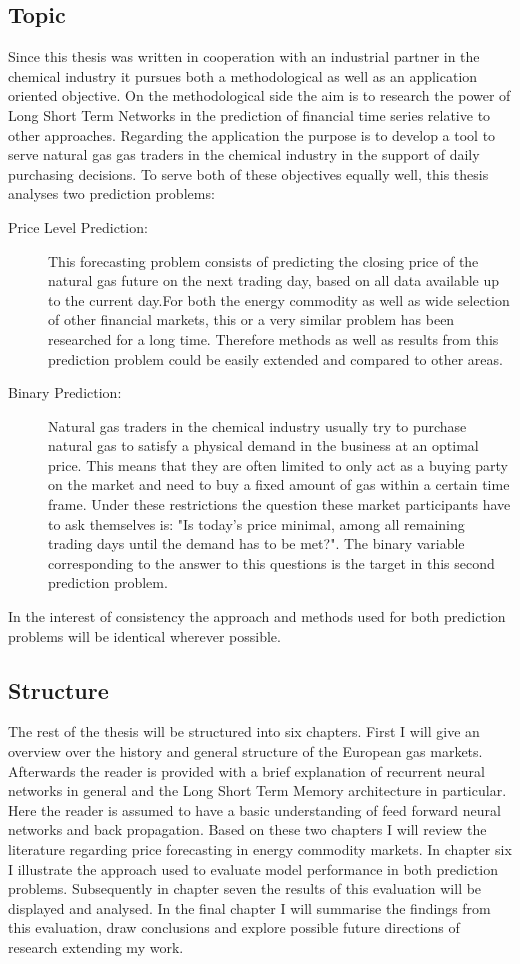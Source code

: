 \subsection{Topic}
Since this thesis was written in cooperation with an industrial partner in the chemical industry it pursues both a methodological as well as an application oriented objective. On the methodological side the aim is to research the power of Long Short Term Networks in the prediction of financial time series relative to other approaches. Regarding the application the purpose is to develop a tool to serve natural gas gas traders in the chemical industry in the support of daily purchasing decisions. To serve both of these objectives equally well, this thesis analyses two prediction problems:
\begin{description}
\item[Price Level Prediction:] This forecasting problem consists of predicting the closing price of the natural gas future on the next trading day, based on all data available up to the current day.For both the energy commodity as well as wide selection of other financial markets, this or a very similar problem has been researched for a long time. Therefore methods as well as results from this prediction problem could be easily extended and compared to other areas.
\item[Binary Prediction:] Natural gas traders in the chemical industry usually try to purchase natural gas to satisfy a physical demand in the business at an optimal price. This means that they are often limited to only act as a buying party on the market and need to buy a fixed amount of gas within a certain time frame. Under these restrictions the question these market participants have to ask themselves is: "Is today's price minimal, among all remaining trading days until the demand has to be met?". The binary variable corresponding to the answer to this questions is the target in this second prediction problem.
\end{description}
In the interest of consistency the approach and methods used for both prediction problems will be identical wherever possible.
\subsection{Structure}
The rest of the thesis will be structured into six chapters. First I will give an overview over the history and general structure of the European gas markets. Afterwards the reader is provided with a brief explanation of recurrent neural networks in general and the Long Short Term Memory architecture in particular. Here the reader is assumed to have a basic understanding of feed forward neural networks and back propagation. Based on these two chapters I will review the literature regarding price forecasting in energy commodity markets. In chapter six I illustrate the approach used to evaluate model performance in both prediction problems. Subsequently in chapter seven the results of this evaluation will be displayed and analysed. In the final chapter I will summarise the findings from this evaluation, draw conclusions and explore possible future directions of research extending my work. 